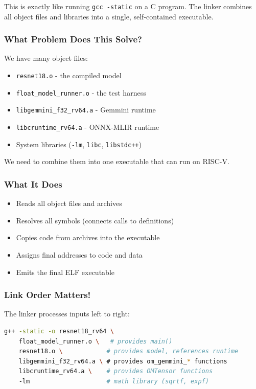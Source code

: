 \documentclass[12pt,a4paper]{article}
\begin{document}
\begin{analogyenv}
This is exactly like running \texttt{gcc -static} on a C program. The linker combines all object files and libraries into a single, self-contained executable.
\end{analogyenv}

\subsubsection{What Problem Does This Solve?}
We have many object files:
\begin{itemize}
  \item \texttt{resnet18.o} - the compiled model
  \item \texttt{float\_model\_runner.o} - the test harness
  \item \texttt{libgemmini\_f32\_rv64.a} - Gemmini runtime
  \item \texttt{libcruntime\_rv64.a} - ONNX-MLIR runtime
  \item System libraries (\texttt{-lm}, \texttt{libc}, \texttt{libstdc++})
\end{itemize}

We need to combine them into one executable that can run on RISC-V.

\subsubsection{What It Does}
\begin{itemize}
  \item Reads all object files and archives
  \item Resolves all symbols (connects calls to definitions)
  \item Copies code from archives into the executable
  \item Assigns final addresses to code and data
  \item Emits the final ELF executable
\end{itemize}

\subsubsection{Link Order Matters!}
The linker processes inputs left to right:
\begin{lstlisting}[language=bash,caption=Correct Link Order]
g++ -static -o resnet18_rv64 \
    float_model_runner.o \   # provides main()
    resnet18.o \            # provides model, references runtime
    libgemmini_f32_rv64.a \ # provides om_gemmini_* functions
    libcruntime_rv64.a \    # provides OMTensor functions
    -lm                     # math library (sqrtf, expf)
\end{lstlisting}
\end{document}
